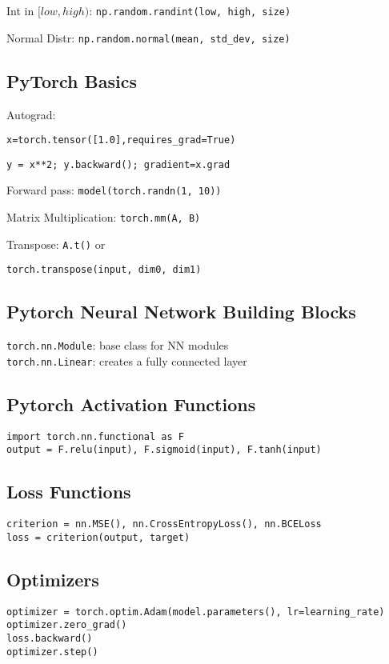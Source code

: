 Int in $[low, high)$: {\color{blue}\verb|np.random.randint(low, high, size)|}

Normal Distr: {\color{blue}\verb|np.random.normal(mean, std_dev, size)|}

\subsection*{PyTorch Basics}

Autograd:
{\color{blue}
\verb|x=torch.tensor([1.0],requires_grad=True)|

\hfill \verb|y = x**2; y.backward(); gradient=x.grad|}

Forward pass: {\color{blue}\verb|model(torch.randn(1, 10))|}

Matrix Multiplication: {\color{blue}\verb|torch.mm(A, B)|}

Transpose: {\color{blue}\verb|A.t()|} or 

\hfill {\color{blue}\verb|torch.transpose(input, dim0, dim1)|}

\subsection*{Pytorch Neural Network Building Blocks}
{\color{blue}\verb|torch.nn.Module|}: base class for NN modules\\
{\color{blue}\verb|torch.nn.Linear|}: creates a fully connected layer

\subsection*{Pytorch Activation Functions}
{\color{blue}\verb|import torch.nn.functional as F|\\
\verb|output = F.relu(input), F.sigmoid(input), F.tanh(input)|}

\subsection*{Loss Functions}
{\color{blue}\verb|criterion = nn.MSE(), nn.CrossEntropyLoss(), nn.BCELoss|\\
\verb|loss = criterion(output, target)|}

\subsection*{Optimizers}
{\color{blue}\verb|optimizer = torch.optim.Adam(model.parameters(), lr=learning_rate)|\\
\verb|optimizer.zero_grad()|\\
\verb|loss.backward()|\\ \verb|optimizer.step()|}

